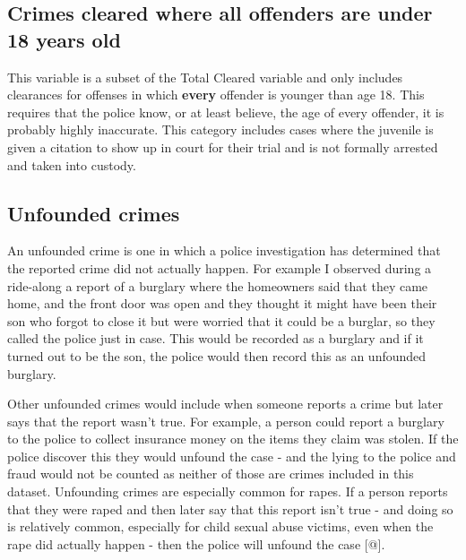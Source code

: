 \documentclass[
  12pt,
  openany]{book}
\begin{document}
\hypertarget{crimes-cleared-where-all-offenders-are-under-18-years-old}{%
\subsection{Crimes cleared where all offenders are under 18 years old}\label{crimes-cleared-where-all-offenders-are-under-18-years-old}}

This variable is a subset of the Total Cleared variable and only includes clearances for offenses in which \textbf{every} offender is younger than age 18. This requires that the police know, or at least believe, the age of every offender, it is probably highly inaccurate. This category includes cases where the juvenile is given a citation to show up in court for their trial and is not formally arrested and taken into custody.

\hypertarget{unfounded-crimes}{%
\subsection{Unfounded crimes}\label{unfounded-crimes}}

An unfounded crime is one in which a police investigation has determined that the reported crime did not actually happen. For example I observed during a ride-along a report of a burglary where the homeowners said that they came home, and the front door was open and they thought it might have been their son who forgot to close it but were worried that it could be a burglar, so they called the police just in case. This would be recorded as a burglary and if it turned out to be the son, the police would then record this as an unfounded burglary.

Other unfounded crimes would include when someone reports a crime but later says that the report wasn't true. For example, a person could report a burglary to the police to collect insurance money on the items they claim was stolen. If the police discover this they would unfound the case - and the lying to the police and fraud would not be counted as neither of those are crimes included in this dataset. Unfounding crimes are especially common for rapes. If a person reports that they were raped and then later say that this report isn't true - and doing so is relatively common, especially for child sexual abuse victims, even when the rape did actually happen - then the police will unfound the case {[}@{]}.
\end{document}
